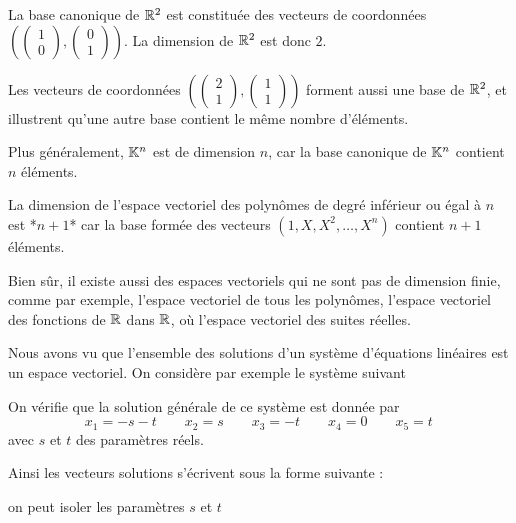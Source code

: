  La base canonique de $\mathbb{R}^2$ est constituée des vecteurs de coordonnées 
$\left( 
\left(\begin{smallmatrix} 1\\0 \end{smallmatrix}\right),
\left(\begin{smallmatrix} 0\\1 \end{smallmatrix}\right)
\right)$. La dimension de $\mathbb{R}^2$ est donc $2$.

\change
  
 Les vecteurs de coordonnées $\left(
  \left(\begin{smallmatrix}2\\1\end{smallmatrix}\right),
  \left(\begin{smallmatrix}1\\1\end{smallmatrix}\right) \right)$
  forment aussi une base de $\mathbb{R}^2$, et illustrent qu'une autre base contient 
  le même nombre d'éléments.
  
  \change
  Plus généralement, $\mathbb{K}^n$ est de dimension $n$, car  la base canonique de $\mathbb{K}^n$
   contient $n$ éléments.
  
  \change
  La dimension de l'espace vectoriel des polynômes de degré 
  inférieur ou égal à $n$ est *$n+1$* car la base formée des vecteurs 
    $(1,X,X^2,\ldots,X^n)$ contient $n+1$ éléments.

Bien s\^ur, il existe aussi des espaces vectoriels qui ne sont pas de dimension finie, comme par exemple, l'espace vectoriel de tous les polynômes,
 l'espace vectoriel des fonctions de $\mathbb{R}$ dans $\mathbb{R}$, 
 o\`u l'espace vectoriel des suites réelles. 


\diapo
Nous avons vu que l'ensemble des solutions d'un système 
d'équations linéaires  est un espace vectoriel. 
On considère par exemple le système suivant

\change
On vérifie que la solution générale de ce système est donnée par $$ x_1 = -s-t\qquad x_2 = s\qquad x_3 = -t\qquad x_4 = 0\qquad x_5 = t\, $$
avec $s$ et $t$ des paramètres réels.


\change
Ainsi les vecteurs solutions s'écrivent sous la forme suivante : 

\change
on peut isoler les paramètres $s$ et $t$

